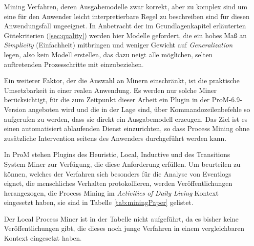 Mining Verfahren, deren Ausgabemodelle zwar korrekt, aber zu komplex sind um eine für den Anwender leicht interpretierbare Regel zu beschreiben sind für diesen Anwendungsfall ungeeignet. In Anbetracht der im Grundlagenkapitel erläuterten Gütekriterien (\ref{sec:quality}) werden hier Modelle gefordert, die ein hohes Maß an \textit{Simplicity} (Einfachheit) mitbringen und weniger Gewicht auf \textit{Generalization} legen, also kein Modell erstellen, das dazu neigt alle möglichen, selten auftretenden Prozesschritte mit einzubeziehen. 

Ein weiterer Faktor, der die Auswahl an Minern einschränkt, ist die praktische Umsetzbarkeit in einer realen Anwendung. Es werden nur solche Miner berücksichtigt, für die zum Zeitpunkt dieser Arbeit ein Plugin in der ProM-6.9-Version angeboten wird und die in der Lage sind, über Kommandozeilenbefehle so aufgerufen zu werden, dass sie direkt ein Ausgabemodell erzeugen. Das Ziel ist es einen automatisiert ablaufenden Dienst einzurichten, so dass Process Mining ohne zusätzliche Intervention seitens des Anwenders durchgeführt werden kann.

In ProM stehen Plugins des Heuristic, Local, Inductive und des Transitions System Miner zur Verfügung, die diese Anforderung erfüllen. Um beurteilen zu können, welches der Verfahren sich besonders für die Analyse von Eventlogs eignet, die menschliches Verhalten protokollieren, werden Veröffentlichungen herangezogen, die Process Mining im \textit{Activities of Daily Living} Kontext eingesetzt haben, sie sind in Tabelle \ref{tab:miningPaper} gelistet. 

Der Local Process Miner ist in der Tabelle nicht aufgeführt, da es bisher keine Veröffentlichungen gibt, die dieses noch junge Verfahren in einem vergleichbaren Kontext eingesetzt haben. 

